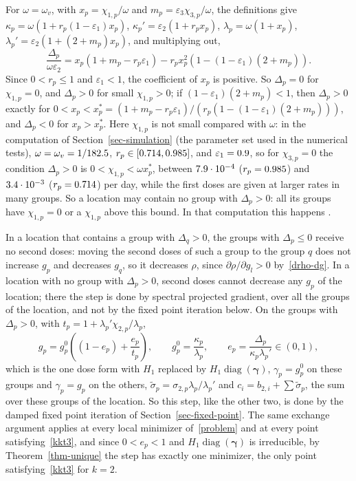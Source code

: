 \documentclass[11pt]{article}
\theoremstyle{plain}
\theoremstyle{remark}
\numberwithin{equation}{section}
\begin{document}
For $\omega=\omega_v$, with $x_p=\chi_{1,p}/\omega$ and $m_p=\varepsilon_3\chi_{3,p}/\omega$,
the definitions give $\kappa_p=\omega(1+r_p(1-\varepsilon_1)x_p)$,
$\kappa_p'=\varepsilon_2(1+r_px_p)$, $\lambda_p=\omega(1+x_p)$,
$\lambda_p'=\varepsilon_2(1+(2+m_p)x_p)$, and multiplying out,
\begin{equation}\label{delta-x}
\frac{\Delta_p}{\omega\varepsilon_2}=x_p\left(1+m_p-r_p\varepsilon_1\right)
-r_px_p^2\left(1-(1-\varepsilon_1)(2+m_p)\right).
\end{equation}
Since $0<r_p\le1$ and $\varepsilon_1<1$, the coefficient of $x_p$ is positive. So
$\Delta_p=0$ for $\chi_{1,p}=0$, and $\Delta_p>0$ for small $\chi_{1,p}>0$; if
$(1-\varepsilon_1)(2+m_p)<1$, then $\Delta_p>0$ exactly for
$0<x_p<x_p^*=(1+m_p-r_p\varepsilon_1)/\left(r_p\left(1-(1-\varepsilon_1)(2+m_p)\right)\right)$,
and $\Delta_p<0$ for $x_p>x_p^*$. Here $\chi_{1,p}$ is not small compared
with $\omega$: in the computation of Section~\ref{sec-simulation} (the parameter set
used in the numerical tests), $\omega=\omega_v=1/182.5$, $r_p\in[0.714,0.985]$, and
$\varepsilon_1=0.9$\RunEpsFirstTo, so for $\chi_{3,p}=0$ the condition
$\Delta_p>0$ is $0<\chi_{1,p}<\omega x_p^*$, between $7.9\cdot10^{-4}$
($r_p=0.985$) and $3.4\cdot10^{-3}$ ($r_p=0.714$) per day\RunDeltaLast, while
the first doses are given at larger rates in many groups. So a location may contain
no group with $\Delta_p>0$: all its groups have $\chi_{1,p}=0$ or a $\chi_{1,p}$
above this bound. In that computation this happens \RunDeltaText.

In a location that contains a group with $\Delta_q>0$, the groups with
$\Delta_p\le 0$ receive no second doses: moving the second doses of such a group
to the group $q$ does not increase $g_p$ and decreases $g_q$, so it decreases
$\rho$, since $\partial\rho/\partial g_l>0$ by~\eqref{drho-dg}. In a location
with no group with $\Delta_p>0$, second doses cannot decrease any $g_p$ of the
location; there the step is done by spectral projected gradient, over all the
groups of the location, and not by the fixed point iteration below. On the groups
with $\Delta_p>0$, with $t_p=1+\lambda_p'\chi_{2,p}/\lambda_p$,
\begin{equation*}
g_p=g_p^0\left((1-e_p)+\frac{e_p}{t_p}\right),\qquad g_p^0=\frac{\kappa_p}{\lambda_p},\qquad
e_p=\frac{\Delta_p}{\kappa_p\lambda_p'}\in(0,1),
\end{equation*}
which is the one dose form with $H_1$ replaced by $H_1\operatorname{diag}(\bm\gamma)$,
$\gamma_p=g_p^0$ on these groups and $\gamma_p=g_p$ on the others,
$\widetilde\sigma_p=\sigma_{2,p}\lambda_p/\lambda_p'$ and
$c_i=b_{2,i}+\sum\widetilde\sigma_p$, the sum over these groups of the location.
So this step, like the other two, is done by the damped fixed point iteration
of Section~\ref{sec-fixed-point}. The same exchange argument applies at every
local minimizer of~\eqref{problem} and at every point satisfying~\eqref{kkt3},
and since $0<e_p<1$ and $H_1\operatorname{diag}(\bm\gamma)$ is irreducible,
by Theorem~\ref{thm-unique} the step has exactly one minimizer, the only point
satisfying~\eqref{kkt3} for $k=2$.
\end{document}
